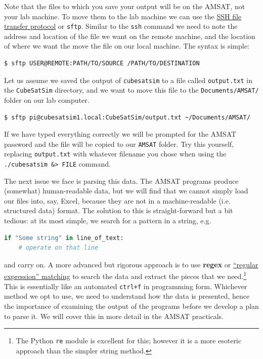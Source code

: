 \documentclass{tufte-book}
\begin{document}


Note that the files to which you save your output will be on the AMSAT, not your lab machine. To move them to the lab machine we can use the \href{https://www.ssh.com/academy/ssh/sftp-ssh-file-transfer-protocol}{SSH file transfer protocol} or \verb|sftp|. Similar to the \verb|ssh| command we need to note the address and location of the file we want on the remote machine, and the location of where we want the move the file on our local machine. The syntax is simple:
\begin{lstlisting}[backgroundcolor=\color{lightgray}, breaklines=true]
$ sftp USER@REMOTE:PATH/TO/SOURCE /PATH/TO/DESTINATION
\end{lstlisting}
Let us assume we saved the output of \verb|cubesatsim| to a file called \verb|output.txt| in the \verb|CubeSatSim| directory, and we want to move this file to the \verb|Documents/AMSAT/| folder on our lab computer.
\begin{lstlisting}[backgroundcolor=\color{lightgray}, breaklines=true]
$ sftp pi@cubesatsim1.local:CubeSatSim/output.txt ~/Documents/AMSAT/
\end{lstlisting}
If we have typed everything correctly we will be prompted for the AMSAT password and the file will be copied to our \verb|AMSAT| folder. Try this yourself, replacing \verb|output.txt| with whatever filename you chose when using the \verb|./cubesatsim &> FILE| command.

The next issue we face is parsing this data. The AMSAT programs produce (somewhat) human-readable data, but we will find that we cannot simply load our files into, say, Excel, because they are not in a machine-readable (i.e. structured data) format. The solution to this is straight-forward but a bit tedious: at its most simple, we search for a pattern in a string, e.g. 
\begin{lstlisting}[backgroundcolor=\color{lightgray}, breaklines=true, language=Python, showstringspaces=false]
if "Some string" in line_of_text:
    # operate on that line
\end{lstlisting}

\noindent and carry on. A more advanced but rigorous approach is to use 
\textbf{regex} or \href{https://www.gnu.org/software/gnulib/manual/html_node/Regular-expressions.html}{``regular expression'' matching} to search the data and extract the pieces that we need.\footnote{The Python \texttt{re} module is excellent for this; however it is a more esoteric approach than the simpler string method.} This is essentially like an automated \verb|ctrl+f| in programming form. Whichever method we opt to use, we need to understand how the data is presented, hence the importance of examining the output of the programs before we develop a plan to parse it. We will cover this in more detail in the AMSAT practicals.
\end{document}
